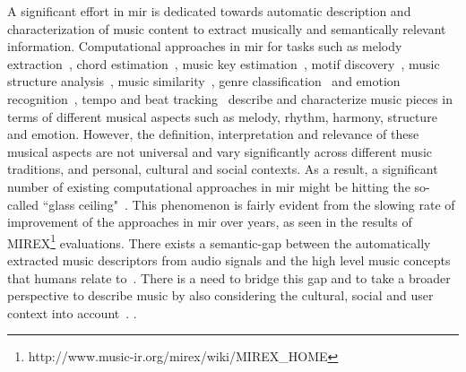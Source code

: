 A significant effort in \gls{mir} is dedicated towards automatic description and characterization of music content to extract musically and semantically relevant information. Computational approaches in \gls{mir} for tasks such as melody extraction~\citep{salamon:phd:13}, chord estimation~\citep{mcvicar2014automatic}, music key estimation~\citep{peeters2006chroma}, motif discovery~\citep{collins2011improved,Conklin2010}, music structure analysis~\citep{paulus2010state,serra2012unsupervised}, music similarity~\citep{joan_thesis}, genre classification~\cite{aucouturier2003representing} and emotion recognition~\citep{kim2010music}, tempo and beat tracking~\citep{gouyon2005review,scheirer1998tempo} describe and characterize music pieces in terms of different musical aspects such as melody, rhythm, harmony, structure and emotion. However, the definition, interpretation and relevance of these musical aspects are not universal and vary significantly across different music traditions,  and personal, cultural and social contexts. As a result, a significant number of existing computational approaches in \gls{mir} might be hitting the so-called ``glass ceiling"~\citep{pachet2004improving,casey2008content}. This phenomenon is fairly evident from the slowing rate of improvement of the approaches in \gls{mir} over years, as seen in the results of MIREX\footnote{http://www.music-ir.org/mirex/wiki/MIREX\_HOME} evaluations. There exists a semantic-gap between the automatically extracted music descriptors from audio signals and the high level music concepts that humans relate to~\citep{celma2006foafing,casey2008content}. There is a need to bridge this gap and to take a broader perspective to describe music by also considering the cultural, social and user context into account~\citep{roadmap_mir}. .

%

